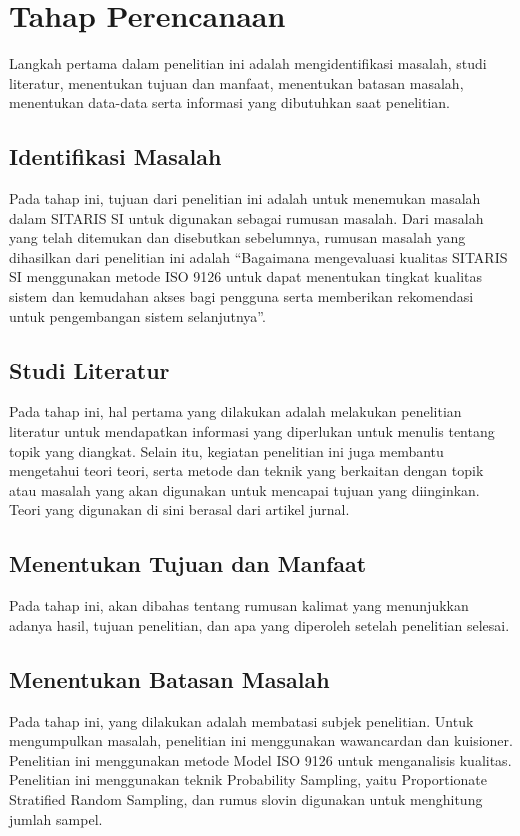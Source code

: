 \section{Tahap Perencanaan}
Langkah pertama dalam penelitian ini adalah mengidentifikasi masalah, studi literatur, menentukan tujuan dan manfaat, menentukan batasan masalah, menentukan data-data serta informasi yang dibutuhkan saat penelitian.

\subsection{Identifikasi Masalah}
Pada tahap ini, tujuan dari penelitian ini adalah untuk menemukan masalah dalam SITARIS SI untuk digunakan sebagai rumusan masalah. Dari masalah yang telah ditemukan dan disebutkan sebelumnya, rumusan masalah yang dihasilkan dari penelitian ini adalah “Bagaimana mengevaluasi kualitas SITARIS SI menggunakan metode ISO 9126 untuk dapat menentukan tingkat kualitas sistem dan kemudahan akses bagi pengguna serta memberikan rekomendasi untuk pengembangan sistem selanjutnya”.

\subsection{Studi Literatur}
Pada tahap ini, hal pertama yang dilakukan adalah melakukan penelitian literatur untuk mendapatkan informasi yang diperlukan untuk menulis tentang topik yang diangkat. Selain itu, kegiatan penelitian ini juga membantu mengetahui teori teori, serta metode dan teknik yang berkaitan dengan topik atau masalah yang akan digunakan untuk mencapai tujuan yang diinginkan. Teori yang digunakan di sini berasal dari artikel jurnal.

\subsection{Menentukan Tujuan dan Manfaat}
Pada tahap ini, akan dibahas tentang rumusan kalimat yang menunjukkan adanya hasil, tujuan penelitian, dan apa yang diperoleh setelah penelitian selesai.

\subsection{Menentukan Batasan Masalah}
Pada tahap ini, yang dilakukan adalah membatasi subjek penelitian. Untuk mengumpulkan masalah, penelitian ini menggunakan wawancardan dan kuisioner. Penelitian ini menggunakan metode Model ISO 9126 untuk menganalisis kualitas. Penelitian ini menggunakan teknik Probability Sampling, yaitu Proportionate Stratified Random Sampling, dan rumus slovin digunakan untuk menghitung jumlah sampel.

